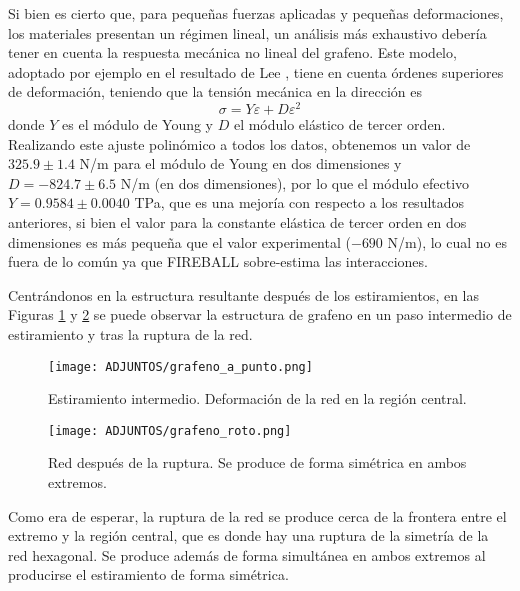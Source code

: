 Si bien es cierto que, para pequeñas fuerzas aplicadas y pequeñas deformaciones, los materiales presentan un régimen lineal, un análisis más exhaustivo debería tener en cuenta la respuesta mecánica no lineal del grafeno. Este modelo, adoptado por ejemplo en el resultado de Lee \cite{science}, tiene en cuenta órdenes superiores de deformación, teniendo que la tensión mecánica en la dirección \arm es
\begin{equation}
    \sigma = Y \varepsilon + D \varepsilon^2
\end{equation}
donde $Y$ es el módulo de Young y $D$ el módulo elástico de tercer orden. Realizando este ajuste polinómico a todos los datos, obtenemos un valor de $325.9 \pm 1.4$ N/m para el módulo de Young en dos dimensiones y $D = -824.7 \pm 6.5$ N/m (en dos dimensiones), por lo que el módulo efectivo $Y = 0.9584 \pm 0.0040$ TPa, que es una mejoría con respecto a los resultados anteriores, si bien el valor para la constante elástica de tercer orden en dos dimensiones es más pequeña que el valor experimental ($-690 $ N/m), lo cual no es fuera de lo común ya que FIREBALL sobre-estima las interacciones. 

Centrándonos en la estructura resultante después de los estiramientos, en las Figuras \ref{fig:4.19} y \ref{fig:4.6} se puede observar la estructura de grafeno en un paso intermedio de estiramiento y tras la ruptura de la red. 

\begin{figure}[!h]
    \centering
    \texttt{[image: ADJUNTOS/grafeno\_a\_punto.png]}  
    \caption{Estiramiento intermedio. Deformación de la red en la región central.}
    \label{fig:4.19}
\end{figure}
\begin{figure}[!h]
    \centering
    \texttt{[image: ADJUNTOS/grafeno\_roto.png]}
    \caption{Red después de la ruptura. Se produce de forma simétrica en ambos extremos.}
    \label{fig:4.6}
\end{figure}

Como era de esperar, la ruptura de la red se produce cerca de la frontera entre el extremo y la región central, que es donde hay una ruptura de la simetría de la red hexagonal. Se produce además de forma simultánea en ambos extremos al producirse el estiramiento de forma simétrica.\\


